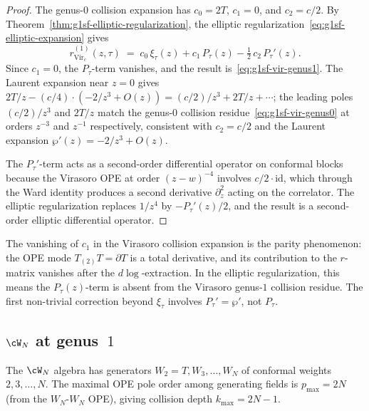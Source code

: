 \begin{proof}
The genus-$0$ collision expansion has $c_0 = 2T$, $c_1 = 0$, and
$c_2 = c/2$. By
Theorem~\ref{thm:g1sf-elliptic-regularization}, the elliptic
regularization~\eqref{eq:g1sf-elliptic-expansion} gives
\[
r_{\mathrm{Vir}_c}^{(1)}(z, \tau)
\;=\;
c_0\, \xi_\tau(z)
+ c_1\, P_\tau(z)
- \tfrac{1}{2}\, c_2\, P_\tau'(z).
\]
Since $c_1 = 0$, the $P_\tau$-term vanishes, and the result
is~\eqref{eq:g1sf-vir-genus1}. The Laurent expansion near
$z = 0$ gives
$2T/z - (c/4)\cdot(-2/z^3 + O(z)) = (c/2)/z^3 + 2T/z + \cdots$;
the leading poles $(c/2)/z^3$ and $2T/z$ match the genus-$0$ collision
residue~\eqref{eq:g1sf-vir-genus0} at orders $z^{-3}$ and $z^{-1}$
respectively, consistent with $c_2 = c/2$ and the Laurent expansion
$\wp'(z) = -2/z^3 + O(z)$.

The $P_\tau'$-term acts as a second-order differential operator on
conformal blocks because the Virasoro OPE at order $(z-w)^{-4}$
involves $c/2 \cdot \mathrm{id}$, which through the Ward identity
produces a second derivative $\partial_z^2$ acting on the
correlator. The elliptic regularization replaces $1/z^4$ by
$-P_\tau'(z)/2$, and the result is a second-order
elliptic differential operator.
\end{proof}

\begin{remark}[The $c_1 = 0$ vanishing]
\label{rem:g1sf-c1-vanishing}
The vanishing of $c_1$ in the Virasoro collision expansion is the
parity phenomenon: the OPE mode $T_{(2)}T = \partial T$ is a
total derivative, and its contribution to the $r$-matrix vanishes
after the $d\log$-extraction. In the elliptic regularization, this
means the $P_\tau(z)$-term is absent from the Virasoro genus-$1$
collision residue. The first non-trivial correction beyond
$\xi_\tau$ involves $P_\tau'=\wp'$, not $P_\tau$.
\end{remark}

\subsection{$\cW_N$ at genus~$1$}
\label{sec:g1sf-wn}

The $\cW_N$ algebra has generators $W_2 = T, W_3, \ldots, W_N$ of
conformal weights $2, 3, \ldots, N$. The maximal OPE pole order among
generating fields is $p_{\max} = 2N$ (from the $W_N$-$W_N$ OPE), giving
collision depth $k_{\max} = 2N - 1$.

